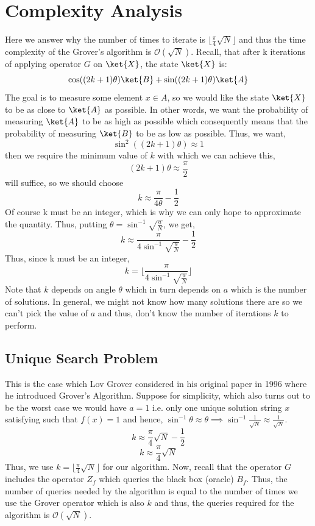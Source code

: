 \documentclass[12pt, oneside]{book}
\theoremstyle{definition}
\theoremstyle{definition}
\theoremstyle{remark}
\begin{document}
\section{Complexity Analysis}\label{sec:Complexity Analysis_Grover}Here we answer why the number of times to iterate is $\lfloor \frac{\pi}{4}\sqrt{N} \rfloor$ and thus the time complexity of the Grover's algorithm is $\mathcal{O}(\sqrt{N})$. Recall, that after k iterations of applying operator $G$ on $\ket{X}$, the state $\ket{X}$ is:
\[
\cos ((2k+1)\theta) \ket{B} + \sin ((2k+1)\theta)\ket{A}
\]
The goal is to measure some element $x \in A$, so we would like the state $\ket{X}$ to be as close to $\ket{A}$ as possible. In other words, we want the probability of measuring $\ket{A}$ to be as high as possible which consequently means that the probability of measuring $\ket{B}$ to be as low as possible. Thus, we want,
\[
\sin^2 ((2k+1)\theta) \approx 1
\]
then we require the minimum value of $k$ with which we can achieve this,
\[
(2k+1)\theta \approx \frac{\pi}{2}
\]
will suffice, so we should choose
\[
k \approx \frac{\pi}{4\theta}-\frac{1}{2}
\]
Of course k must be an integer, which is why we can only hope to approximate the quantity. Thus, putting $\theta = \sin^{-1} \sqrt{\frac{a}{N}}$, we get,
\[
k \approx \frac{\pi}{4 \sin^{-1} \sqrt{\frac{a}{N}}} - \frac{1}{2}
\]
Thus, since k must be an integer,
\[
k = \lfloor \frac{\pi}{4 \sin^{-1} \sqrt{\frac{a}{N}}} \rfloor
\]
Note that $k$ depends on angle $\theta$ which in turn depends on $a$ which is the number of solutions. In general, we might not know how many solutions there are so we can't pick the value of $a$ and thus, don't know the number of iterations $k$ to perform.
\subsection{Unique Search Problem}
This is the case which Lov Grover considered in his original paper in 1996 where he introduced Grover's Algorithm. Suppose for simplicity, which also turns out to be the worst case we would have $a=1$ i.e. only one unique solution string $x$ satisfying such that $f(x)=1$ and hence, $\sin^{-1} \theta \approx \theta \implies \sin^{-1}\frac{1}{\sqrt{N}} \approx \frac{1}{\sqrt{N}}$.
\[
k \approx \frac{\pi}{4}\sqrt{N} -\frac{1}{2}
\]
\[
k \approx \frac{\pi}{4}\sqrt{N}
\]
Thus, we use $k=\lfloor \frac{\pi}{4}\sqrt{N} \rfloor$ for our algorithm. Now, recall that the operator $G$ includes the operator $Z_f$ which queries the black box (oracle) $B_f$. Thus, the number of queries needed by the algorithm is equal to the number of times we use the Grover operator which is also $k$ and thus, the queries required for the algorithm is $\mathcal{O}(\sqrt{N})$.
\end{document}
